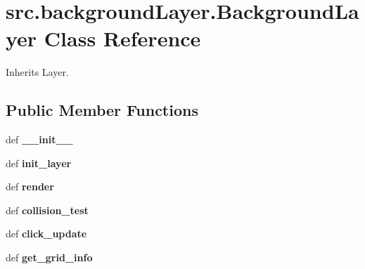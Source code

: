 \hypertarget{classsrc_1_1background_layer_1_1_background_layer}{\section{src.\-background\-Layer.\-Background\-Layer \-Class \-Reference}
\label{classsrc_1_1background_layer_1_1_background_layer}
}


\-Inherits \-Layer.

\subsection*{\-Public \-Member \-Functions}
\begin{DoxyCompactItemize}
\item 
\hypertarget{classsrc_1_1background_layer_1_1_background_layer_ae7e7e455a7a88cdab390a9cb93a9eb4a}{def {\bfseries \-\_\-\-\_\-init\-\_\-\-\_\-}}\label{classsrc_1_1background_layer_1_1_background_layer_ae7e7e455a7a88cdab390a9cb93a9eb4a}

\item 
\hypertarget{classsrc_1_1background_layer_1_1_background_layer_ad8afb5ff0c6e1b50bf46eb3e4b46e2dd}{def {\bfseries init\-\_\-layer}}\label{classsrc_1_1background_layer_1_1_background_layer_ad8afb5ff0c6e1b50bf46eb3e4b46e2dd}

\item 
\hypertarget{classsrc_1_1background_layer_1_1_background_layer_a162fbe6dab81ed5558efffa508ba0666}{def {\bfseries render}}\label{classsrc_1_1background_layer_1_1_background_layer_a162fbe6dab81ed5558efffa508ba0666}

\item 
\hypertarget{classsrc_1_1background_layer_1_1_background_layer_a73489d709ee450b021a1a459d694a190}{def {\bfseries collision\-\_\-test}}\label{classsrc_1_1background_layer_1_1_background_layer_a73489d709ee450b021a1a459d694a190}

\item 
\hypertarget{classsrc_1_1background_layer_1_1_background_layer_a7b4f4b6825d38a5f142035a38311764b}{def {\bfseries click\-\_\-update}}\label{classsrc_1_1background_layer_1_1_background_layer_a7b4f4b6825d38a5f142035a38311764b}

\item 
\hypertarget{classsrc_1_1background_layer_1_1_background_layer_a1ce10e002026bf3d6c9fd9392ebb479d}{def {\bfseries get\-\_\-grid\-\_\-info}}\label{classsrc_1_1background_layer_1_1_background_layer_a1ce10e002026bf3d6c9fd9392ebb479d}

\end{DoxyCompactItemize}
